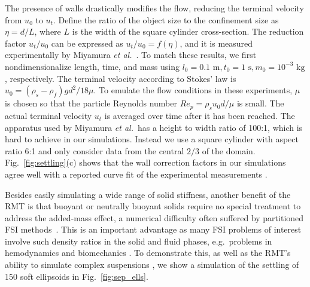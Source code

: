 \documentclass[times, 10pt]{article}
\newcommand{\Rey}{\textit{Re}}
\begin{document}
\begin{multicols}{2}
The presence of walls drastically modifies the flow, reducing the terminal velocity from $u_0$ to $u_t$.
Define the ratio of the object size to the confinement size as $\eta = d/L$, where $L$ is the width of the square cylinder cross-section.
The reduction factor $u_t/u_0$ can be expressed as $u_t/u_0 = f(\eta)$, and it is measured experimentally by Miyamura \textit{et al.}~\cite{miyamura81}.
To match these results, we first nondimensionalize length, time, and mass using $l_0 = 0.1 \text{~m}, t_0 = 1 \text{~s}, m_0 = 10^{-3} \text{~kg}$, respectively.
The terminal velocity according to Stokes' law is $u_0 = {(\rho_s - \rho_f)gd^2}/{18\mu}$.
To emulate the flow conditions in these experiments, $\mu$ is chosen so that the particle Reynolds number $\Rey_p = \rho_s u_0 d / \mu$ is small.
The actual terminal velocity $u_t$ is averaged over time after it has been reached.
The apparatus used by Miyamura \textit{et al.}~has a height to width ratio of 100:1, which is hard to achieve in our simulations.
Instead we use a square cylinder with aspect ratio 6:1 and only consider data from the central $2/3$ of the domain.
Fig.~\ref{fig:settling}(c) shows that the wall correction factors in our simulations agree well with a reported curve fit of the experimental measurements \cite{miyamura81}.

Besides easily simulating a wide range of solid stiffness,
another benefit of the RMT is that buoyant or neutrally buoyant solids require no special treatment to address the added-mass effect, a numerical difficulty often suffered by partitioned FSI methods~\cite{causin05}.
This is an important advantage as many FSI problems of interest involve such density ratios in the solid and fluid phases, e.g.~problems in hemodynamics \cite{fai17a} and biomechanics \cite{kanso17}.
To demonstrate this, as well as the RMT's ability to simulate complex suspensions \cite{lindner14},
we show a simulation of the settling of 150 soft ellipsoids in Fig.~\ref{fig:sep_ells}.


\end{multicols}
\end{document}
